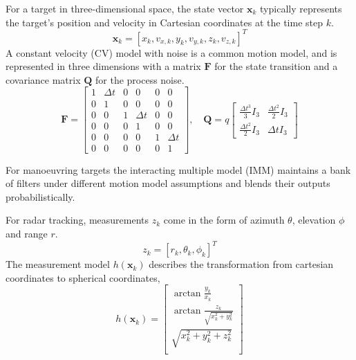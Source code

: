 For a target in three-dimensional space, the state vector \(\mathbf{x}_k\) typically 
represents the target's position and velocity in Cartesian coordinates at the time
step \(k\). 
\begin{equation}
    \mathbf{x}_k = [x_k, v_{x,k}, y_k, v_{y,k}, z_k, v_{z,k}]^T
\end{equation}
A constant velocity (CV) model with noise is a 
common motion model, and is represented in three dimensions with a matrix 
\(\mathbf{F}\) for the state transition and a covariance matrix \(\mathbf{Q}\)
for the process noise. 
\begin{equation}
    \mathbf{F} = \begin{bmatrix}
    1 & \Delta t & 0 & 0 & 0 & 0 \\
    0 & 1 & 0 & 0 & 0 & 0 \\
    0 & 0 & 1 & \Delta t & 0 & 0 \\
    0 & 0 & 0 & 1 & 0 & 0 \\
    0 & 0 & 0 & 0 & 1 & \Delta t \\
    0 & 0 & 0 & 0 & 0 & 1
    \end{bmatrix}, 
    \quad
    \mathbf{Q} = q \begin{bmatrix}
    \frac{\Delta t^3}{3}I_3 & \frac{\Delta t^2}{2}I_3 \\
    \frac{\Delta t^2}{2}I_3 & \Delta t I_3
    \end{bmatrix}
\end{equation}

For manoeuvring targets the interacting multiple model (IMM) \cite{blom1988imm} 
maintains a bank of filters under different motion model assumptions and blends their outputs 
probabilistically.

For radar tracking, measurements \(z_k\) come in the form of azimuth \(\theta\), 
elevation \(\phi\) and range \(r\).   
\begin{equation}
    z_k = [r_k, \theta_k, \phi_k]^T
\end{equation}
The measurement model \(h(\mathbf{x}_k)\) describes the transformation from 
cartesian coordinates to spherical coordinates, 
\begin{equation}
    h(\mathbf{x}_k) = \begin{bmatrix}
    \arctan{\frac{y_k}{x_k}} \\
    \arctan{\frac{z_k}{\sqrt{x_k^2 + y_k^2}}} \\
    \sqrt{x_k^2 + y_k^2 + z_k^2} \\
    \end{bmatrix}
\end{equation}

